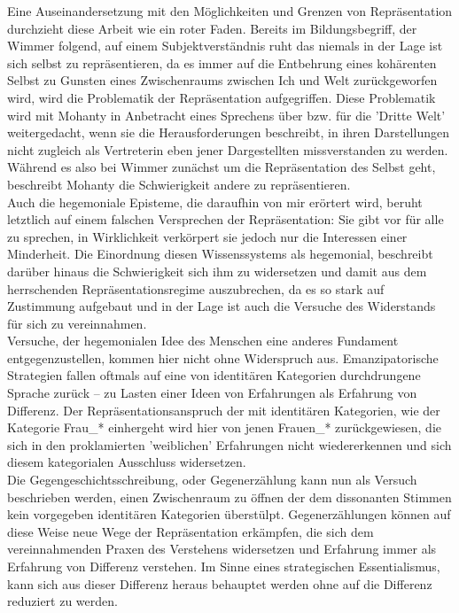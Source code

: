   Eine Auseinandersetzung mit den Möglichkeiten und Grenzen von Repräsentation
  durchzieht diese Arbeit wie ein roter Faden. Bereits im Bildungsbegriff, der
  Wimmer folgend, auf einem Subjektverständnis ruht das niemals in der Lage ist
  sich selbst zu repräsentieren, da es immer auf die Entbehrung eines
  kohärenten Selbst zu Gunsten eines Zwischenraums zwischen Ich und Welt
  zurückgeworfen wird, wird die Problematik der Repräsentation aufgegriffen.
  Diese Problematik wird mit  Mohanty in Anbetracht eines Sprechens über bzw.
  für die 'Dritte Welt' weitergedacht, wenn sie die Herausforderungen
  beschreibt, in ihren Darstellungen nicht zugleich als Vertreterin eben jener
  Dargestellten missverstanden zu werden. Während es also bei Wimmer zunächst
  um die Repräsentation des Selbst geht, beschreibt Mohanty die Schwierigkeit
  andere zu repräsentieren.\\
  
  \noindent Auch die hegemoniale Episteme, die daraufhin von
  mir erörtert wird, beruht letztlich auf einem falschen Versprechen der
  Repräsentation: Sie gibt vor für alle zu sprechen,  in Wirklichkeit
  verkörpert sie jedoch nur die Interessen einer Minderheit.  Die Einordnung
  diesen Wissenssystems als hegemonial, beschreibt darüber hinaus die
  Schwierigkeit sich ihm zu widersetzen und damit aus dem herrschenden
  Repräsentationsregime auszubrechen, da es so stark auf  Zustimmung aufgebaut
  und in der Lage ist auch die Versuche des Widerstands für sich zu
  vereinnahmen.\\

  \noindent Versuche, der hegemonialen Idee des  Menschen eine anderes Fundament
  entgegenzustellen,  kommen hier nicht ohne Widerspruch aus. Emanzipatorische
  Strategien fallen oftmals auf eine von identitären Kategorien durchdrungene
  Sprache zurück – zu Lasten einer Ideen von Erfahrungen als Erfahrung von
  Differenz. Der Repräsentationsanspruch der mit identitären Kategorien, wie
  der Kategorie Frau\_* einhergeht wird hier von jenen Frauen\_* zurückgewiesen,
  die sich in den proklamierten 'weiblichen' Erfahrungen nicht wiedererkennen
  und sich diesem kategorialen Ausschluss widersetzen.\\

  \noindent Die Gegengeschichtsschreibung, oder Gegenerzählung kann nun als Versuch
  beschrieben werden, einen Zwischenraum zu öffnen der dem dissonanten Stimmen
  kein vorgegeben identitären Kategorien überstülpt. Gegenerzählungen  können
  auf diese Weise neue Wege der Repräsentation erkämpfen, die sich dem
  vereinnahmenden Praxen des Verstehens widersetzen und Erfahrung immer als
  Erfahrung von Differenz verstehen. Im Sinne eines strategischen
  Essentialismus, kann sich aus dieser Differenz heraus behauptet werden ohne
  auf die Differenz reduziert zu werden.\\
 
